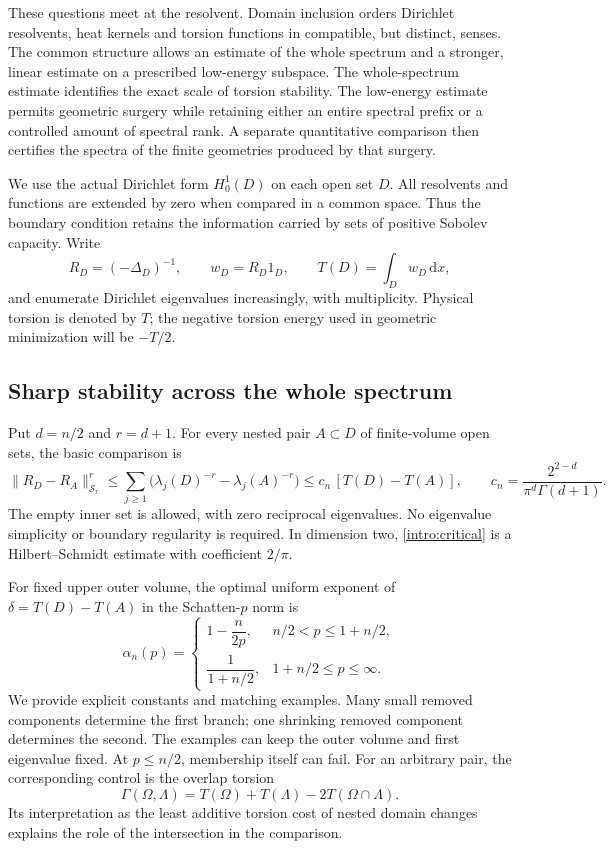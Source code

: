 \documentclass[11pt,reqno]{amsart}
\numberwithin{equation}{section}
\newcommand{\dd}{\,\mathrm d}
\newcommand{\norm}[1]{\lVert#1\rVert}
\begin{document}
These questions meet at the resolvent. Domain inclusion orders
Dirichlet resolvents, heat kernels and torsion functions in compatible,
but distinct, senses. The common structure allows an estimate of the
whole spectrum and a stronger, linear estimate on a prescribed
low-energy subspace. The whole-spectrum estimate identifies the exact
scale of torsion stability. The low-energy estimate permits geometric
surgery while retaining either an entire spectral prefix or a
controlled amount of spectral rank. A separate quantitative comparison
then certifies the spectra of the finite geometries produced by that
surgery.

We use the actual Dirichlet form \(H_0^1(D)\) on each open set \(D\).
All resolvents and functions are extended by zero when compared in a
common space. Thus the boundary condition retains the information
carried by sets of positive Sobolev capacity. Write
\[
 R_D=(-\Delta_D)^{-1},\qquad
 w_D=R_D1_D,\qquad T(D)=\int_D w_D\dd x,
\]
and enumerate Dirichlet eigenvalues increasingly, with multiplicity.
Physical torsion is denoted by \(T\); the negative torsion energy used
in geometric minimization will be \(-T/2\).

\subsection*{Sharp stability across the whole spectrum}

Put \(d=n/2\) and \(r=d+1\). For every nested pair \(A\subset D\)
of finite-volume open sets, the basic comparison is
\begin{equation}\label{intro:critical}
 \norm{R_D-R_A}_{\mathcal S_r}^{r}
 \le \sum_{j\ge1}
      \bigl(\lambda_j(D)^{-r}-\lambda_j(A)^{-r}\bigr)
 \le c_n\,[T(D)-T(A)],
 \qquad
 c_n=\frac{2^{2-d}}{\pi^d\Gamma(d+1)}.
\end{equation}
The empty inner set is allowed, with zero reciprocal eigenvalues.
No eigenvalue simplicity or boundary regularity is required.
In dimension two, \eqref{intro:critical} is a Hilbert--Schmidt
estimate with coefficient \(2/\pi\).

For fixed upper outer volume, the optimal uniform exponent of
\(\delta=T(D)-T(A)\) in the Schatten-\(p\) norm is
\begin{equation}\label{intro:sharp-exponent}
 \alpha_n(p)=
 \begin{cases}
  1-\dfrac{n}{2p},&n/2<p\le1+n/2,\\[4pt]
  \dfrac{1}{1+n/2},&1+n/2\le p\le\infty.
 \end{cases}
\end{equation}
We provide explicit constants and matching examples. Many small
removed components determine the first branch; one shrinking removed
component determines the second. The examples can keep the outer
volume and first eigenvalue fixed. At \(p\le n/2\), membership itself
can fail. For an arbitrary pair, the corresponding control is the
overlap torsion
\[
 \Gamma(\Omega,\Lambda)
 =T(\Omega)+T(\Lambda)-2T(\Omega\cap\Lambda).
\]
Its interpretation as the least additive torsion cost of nested
domain changes explains the role of the intersection in the
comparison.
\end{document}
